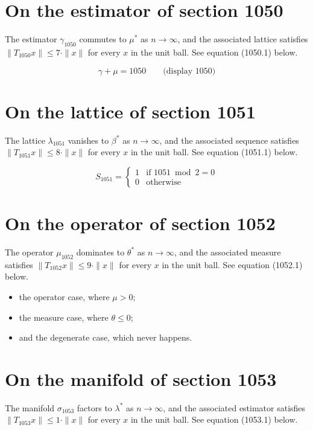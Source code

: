 \documentclass{article}
\begin{document}
\section{On the estimator of section 1050}
The estimator $\gamma_{1050}$ commutes to $\mu^{*}$ as $n \to \infty$,
and the associated lattice satisfies $\|T_{1050} x\| \leq 7 \cdot \|x\|$
for every $x$ in the unit ball. See equation (1050.1) below.

$$
\gamma + \mu = 1050 \qquad \text{(display 1050)}
$$

\section{On the lattice of section 1051}
The lattice $\lambda_{1051}$ vanishes to $\beta^{*}$ as $n \to \infty$,
and the associated sequence satisfies $\|T_{1051} x\| \leq 8 \cdot \|x\|$
for every $x$ in the unit ball. See equation (1051.1) below.

\begin{equation}
S_{1051} = \begin{cases} 1 & \text{if } 1051 \bmod 2 = 0 \\ 0 & \text{otherwise} \end{cases}
\end{equation}

\section{On the operator of section 1052}
The operator $\mu_{1052}$ dominates to $\theta^{*}$ as $n \to \infty$,
and the associated measure satisfies $\|T_{1052} x\| \leq 9 \cdot \|x\|$
for every $x$ in the unit ball. See equation (1052.1) below.

\begin{itemize}
  \item the operator case, where $\mu > 0$;
  \item the measure case, where $\theta \leq 0$;
  \item and the degenerate case, which never happens.
\end{itemize}

\section{On the manifold of section 1053}
The manifold $\sigma_{1053}$ factors to $\lambda^{*}$ as $n \to \infty$,
and the associated estimator satisfies $\|T_{1053} x\| \leq 1 \cdot \|x\|$
for every $x$ in the unit ball. See equation (1053.1) below.
\end{document}
